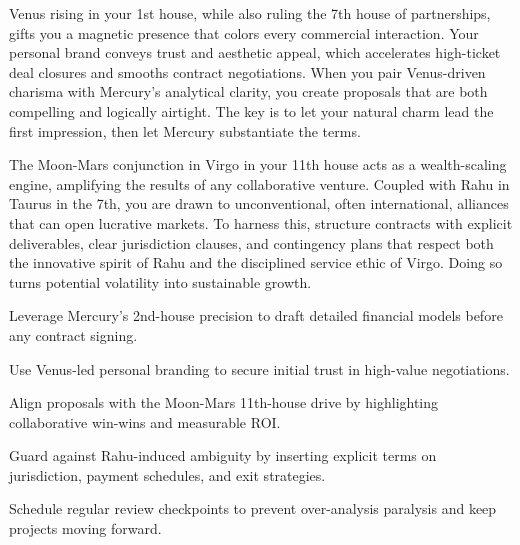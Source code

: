 {\fontsize{9}{13}\selectfont Venus rising in your 1st house, while also ruling the 7th house of partnerships, gifts you a magnetic presence that colors every commercial interaction. Your personal brand conveys trust and aesthetic appeal, which accelerates high-ticket deal closures and smooths contract negotiations. When you pair Venus-driven charisma with Mercury's analytical clarity, you create proposals that are both compelling and logically airtight. The key is to let your natural charm lead the first impression, then let Mercury substantiate the terms.}\par\vspace{1.8mm}

{\fontsize{9}{13}\selectfont The Moon-Mars conjunction in Virgo in your 11th house acts as a wealth-scaling engine, amplifying the results of any collaborative venture. Coupled with Rahu in Taurus in the 7th, you are drawn to unconventional, often international, alliances that can open lucrative markets. To harness this, structure contracts with explicit deliverables, clear jurisdiction clauses, and contingency plans that respect both the innovative spirit of Rahu and the disciplined service ethic of Virgo. Doing so turns potential volatility into sustainable growth.}\par\vspace{1.8mm}

\begin{diamondlist}
  \item {\fontsize{8.5}{12}\selectfont Leverage Mercury's 2nd-house precision to draft detailed financial models before any contract signing.}
  \item {\fontsize{8.5}{12}\selectfont Use Venus-led personal branding to secure initial trust in high-value negotiations.}
  \item {\fontsize{8.5}{12}\selectfont Align proposals with the Moon-Mars 11th-house drive by highlighting collaborative win-wins and measurable ROI.}
  \item {\fontsize{8.5}{12}\selectfont Guard against Rahu-induced ambiguity by inserting explicit terms on jurisdiction, payment schedules, and exit strategies.}
  \item {\fontsize{8.5}{12}\selectfont Schedule regular review checkpoints to prevent over-analysis paralysis and keep projects moving forward.}
\end{diamondlist}


